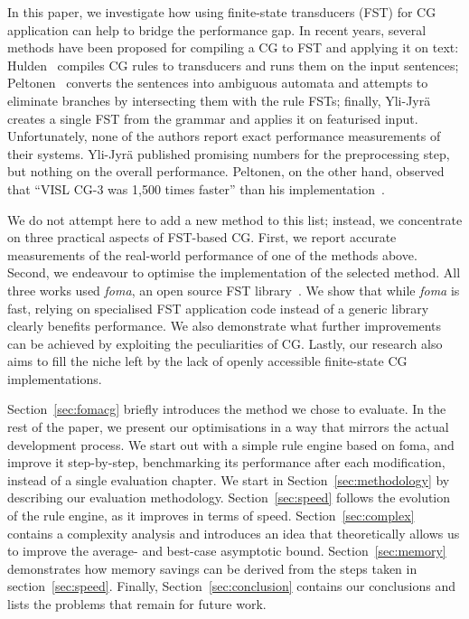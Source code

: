 \documentclass[11pt]{article}
\begin{document}
In this paper, we investigate how using finite-state transducers (FST) for CG
application can help to bridge the performance gap. In recent years, several
methods have been proposed for compiling a CG to FST and applying it on text:
Hulden~ compiles CG rules to transducers and runs them on the
input sentences; Peltonen~ converts the sentences into ambiguous
automata and attempts to eliminate branches by intersecting them with the rule
FSTs; finally, Yli-Jyrä~ creates a single FST from the
grammar and applies it on featurised input. Unfortunately, none of the authors
report exact performance measurements of their systems. Yli-Jyrä published
promising numbers for the preprocessing step, but nothing on the overall
performance. Peltonen, on the other hand, observed that ``VISL CG-3 was 1,500
times faster'' than his implementation~\cite{Peltonen:2011}.

We do not attempt here to add a new method to this list; instead, we
concentrate on three practical aspects of FST-based CG. First, we report accurate
measurements of the real-world performance of one of the methods above. Second,
we endeavour to optimise the implementation of the selected method. All three
works used \emph{foma}, an open source FST library~\cite{Hulden:2009a,Hulden:2009b}.
We show that while \emph{foma} is fast,
relying on specialised FST application code instead of a generic library
clearly benefits performance. We also demonstrate what further improvements can
be achieved by exploiting the peculiarities of CG. Lastly, our research also
aims to fill the niche left by the lack of openly accessible finite-state CG
implementations.

Section~\ref{sec:fomacg} briefly introduces the method we chose to evaluate.
In the rest of the paper, we present our optimisations in a way that mirrors the
actual development process. We start out with a simple rule engine based on
foma, and improve it step-by-step, benchmarking its performance after each
modification, instead of a single evaluation chapter. We start in
Section~\ref{sec:methodology} by describing our evaluation methodology.
Section~\ref{sec:speed} follows the evolution of the rule engine, as it improves
in terms of speed. Section~\ref{sec:complex} contains a complexity analysis
and introduces an idea that theoretically allows us to improve the average- and
best-case asymptotic bound.
Section~\ref{sec:memory} demonstrates how memory savings can be derived from the
steps taken in section~\ref{sec:speed}. Finally, Section~\ref{sec:conclusion}
contains our conclusions and lists the problems that remain for future work.
\end{document}
